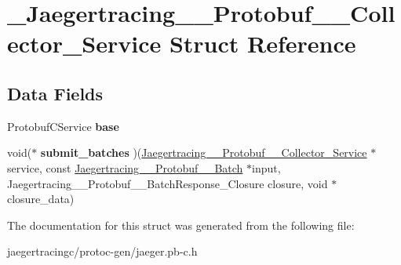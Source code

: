 \hypertarget{struct__Jaegertracing____Protobuf____Collector__Service}{}\section{\+\_\+\+Jaegertracing\+\_\+\+\_\+\+Protobuf\+\_\+\+\_\+\+Collector\+\_\+\+Service Struct Reference}
\label{struct__Jaegertracing____Protobuf____Collector__Service}
\subsection*{Data Fields}
\begin{DoxyCompactItemize}
\item 
\mbox{\label{struct__Jaegertracing____Protobuf____Collector__Service_abeaffec24ae70f2030955ced727f3431}} 
Protobuf\+C\+Service {\bfseries base}
\item 
\mbox{\label{struct__Jaegertracing____Protobuf____Collector__Service_ac4502bf1cdb0155aa7f582b3675e6a24}} 
void($\ast$ {\bfseries submit\+\_\+batches} )(\mbox{\hyperlink{struct__Jaegertracing____Protobuf____Collector__Service}{Jaegertracing\+\_\+\+\_\+\+Protobuf\+\_\+\+\_\+\+Collector\+\_\+\+Service}} $\ast$service, const \mbox{\hyperlink{struct__Jaegertracing____Protobuf____Batch}{Jaegertracing\+\_\+\+\_\+\+Protobuf\+\_\+\+\_\+\+Batch}} $\ast$input, Jaegertracing\+\_\+\+\_\+\+Protobuf\+\_\+\+\_\+\+Batch\+Response\+\_\+\+Closure closure, void $\ast$closure\+\_\+data)
\end{DoxyCompactItemize}


The documentation for this struct was generated from the following file\+:\begin{DoxyCompactItemize}
\item 
jaegertracingc/protoc-\/gen/jaeger.\+pb-\/c.\+h\end{DoxyCompactItemize}
